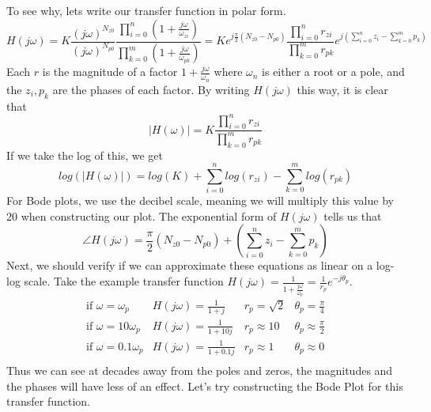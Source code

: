 To see why, lets write our transfer function in polar form. 
\[
H(j\omega) = K \frac{(j\omega)^{N_{z0}}}{(j\omega)^{N_{p0}}}\frac{\prod_{i=0}^{n}{(1+\frac{j\omega}{\omega_{zi}})}}{\prod_{k=0}^{m}{(1+\frac{j\omega}{\omega_{pk}})}} = Ke^{j\frac{\pi}{2}(N_{z0}-N_{p0})} \frac{\prod_{i=0}^{n}{r_{zi}}}{\prod_{k=0}^{m}{r_{pk}}} e^{j(\sum_{i=0}^{n}{z_i} - \sum_{k=0}^{m}{p_k})}
\]
Each $r$ is the magnitude of a factor $1 + \frac{j\omega}{\omega_n}$ where $\omega_n$ is either a root or a pole, and the $z_i, p_k$ are the phases of each factor.
By writing $H(j\omega)$ this way, it is clear that \[
|H(\omega)| = K \frac{\prod_{i=0}^{n}{r_{zi}}}{\prod_{k=0}^{m}{r_{pk}}}
\]
If we take the log of this, we get \[
log(|H(\omega)|) = log(K) + \sum_{i=0}^{n}{log(r_{zi})} - \sum_{k=0}^{m}{log(r_{pk})}
\]
For Bode plots, we use the decibel scale, meaning we will multiply this value by 20 when constructing our plot.
The exponential form of $H(j\omega)$ tells us that \[
\angle H(j\omega) = \frac{\pi}{2}(N_{z0}-N_{p0})+ \left(\sum_{i=0}^{n}{z_i} - \sum_{k=0}^{m}{p_k}\right)
\]
Next, we should verify if we can approximate these equations as linear on a log-log scale.
Take the example transfer function $H(j\omega) = \frac{1}{1+\frac{j\omega}{\omega_p}} = \frac{1}{r_p}e^{-j\theta_p}$.
\[
    \begin{array}{cccc}
        \text{if } \omega = \omega_p & H(j\omega) = \frac{1}{1+j} & r_p = \sqrt{2} & \theta_p = \frac{\pi}{4}\\
        \text{if } \omega = 10\omega_p & H(j\omega) = \frac{1}{1+10j} & r_p \approx 10 & \theta_p \approx \frac{\pi}{2}\\
        \text{if } \omega = 0.1\omega_p & H(j\omega) = \frac{1}{1+0.1j} & r_p \approx 1 & \theta_p \approx 0\\
    \end{array}
\]
Thus we can see at decades away from the poles and zeros, the magnitudes and the phases will have less of an effect.
Let's try constructing the Bode Plot for this transfer function.
